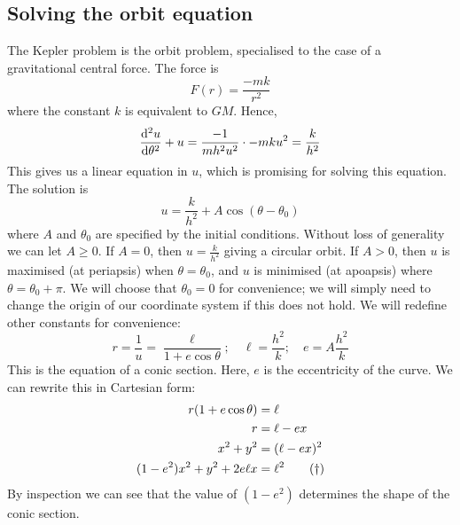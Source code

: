 \subsection{Solving the orbit equation}
The Kepler problem is the orbit problem, specialised to the case of a gravitational central force.
The force is
\[
	F(r) = \frac{-mk}{r^2}
\]
where the constant \(k\) is equivalent to \(GM\).
Hence,
\[
	\dv[2]{u}{\theta} + u = \frac{-1}{mh^2u^2} \cdot -mku^2 = \frac{k}{h^2}
\]
This gives us a linear equation in \(u\), which is promising for solving this equation.
The solution is
\[
	u = \frac{k}{h^2} + A\cos(\theta - \theta_0)
\]
where \(A\) and \(\theta_0\) are specified by the initial conditions.
Without loss of generality we can let \(A \geq 0\).
If \(A = 0\), then \(u = \frac{k}{h^2}\) giving a circular orbit.
If \(A > 0\), then \(u\) is maximised (at periapsis) when \(\theta = \theta_0\), and \(u\) is minimised (at apoapsis) where \(\theta = \theta_0 + \pi\).
We will choose that \(\theta_0 = 0\) for convenience; we will simply need to change the origin of our coordinate system if this does not hold.
We will redefine other constants for convenience:
\[
	r = \frac{1}{u} = \frac{\ell}{1 + e\cos \theta};\quad \ell = \frac{h^2}{k};\quad e = A\frac{h^2}{k}
\]
This is the equation of a conic section.
Here, \(e\) is the eccentricity of the curve.
We can rewrite this in Cartesian form:
\begin{align}
	r(1 + e\cos \theta)         & = \ell \notag              \\
	r                           & = \ell - ex \notag         \\
	x^2 + y^2                   & = (\ell - ex)^2 \notag     \\
	(1-e^2)x^2 + y^2 + 2e\ell x & = \ell^2 \tag{\(\dagger\)}
\end{align}
By inspection we can see that the value of \((1-e^2)\) determines the shape of the conic section.
